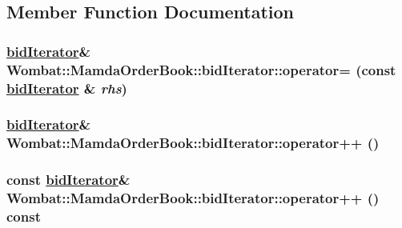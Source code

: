 \subsection{Member Function Documentation}
\hypertarget{classWombat_1_1MamdaOrderBook_1_1bidIterator_3db583c233e6207d7d331af999bbc657}{
\subsubsection[operator=]{\setlength{\rightskip}{0pt plus 5cm}\hyperlink{classWombat_1_1MamdaOrderBook_1_1bidIterator}{bid\-Iterator}\& Wombat::Mamda\-Order\-Book::bid\-Iterator::operator= (const \hyperlink{classWombat_1_1MamdaOrderBook_1_1bidIterator}{bid\-Iterator} \& {\em rhs})}}
\label{classWombat_1_1MamdaOrderBook_1_1bidIterator_3db583c233e6207d7d331af999bbc657}


\hypertarget{classWombat_1_1MamdaOrderBook_1_1bidIterator_14323e1f39cb756231a43e705f5b9a9c}{
\subsubsection[operator++]{\setlength{\rightskip}{0pt plus 5cm}\hyperlink{classWombat_1_1MamdaOrderBook_1_1bidIterator}{bid\-Iterator}\& Wombat::Mamda\-Order\-Book::bid\-Iterator::operator++ ()}}
\label{classWombat_1_1MamdaOrderBook_1_1bidIterator_14323e1f39cb756231a43e705f5b9a9c}


\hypertarget{classWombat_1_1MamdaOrderBook_1_1bidIterator_a83a584c4822f23298d2264e9d56036c}{
\subsubsection[operator++]{\setlength{\rightskip}{0pt plus 5cm}const \hyperlink{classWombat_1_1MamdaOrderBook_1_1bidIterator}{bid\-Iterator}\& Wombat::Mamda\-Order\-Book::bid\-Iterator::operator++ () const}}
\label{classWombat_1_1MamdaOrderBook_1_1bidIterator_a83a584c4822f23298d2264e9d56036c}


